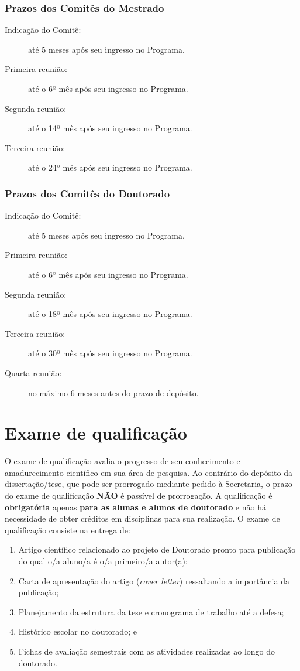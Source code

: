 \subsubsection{Prazos dos Comitês do Mestrado}
\begin{description}
\item[Indicação do Comitê:] até  5 meses após seu ingresso no Programa.
\item[Primeira reunião:] até o 6º mês após seu ingresso no Programa.
\item[Segunda reunião:] até  o 14º mês após seu ingresso no Programa.
\item[Terceira reunião:] até  o 24º mês após seu ingresso no Programa.
\end{description}

\subsubsection{Prazos dos Comitês do Doutorado}
\begin{description}
\item[Indicação do Comitê:] até 5 meses após seu ingresso no Programa.
\item[Primeira reunião:] até o 6º mês após seu ingresso no Programa.
\item[Segunda reunião:] até  o 18º mês após seu ingresso no Programa.
\item[Terceira reunião:] até  o 30º mês após seu ingresso no Programa.
\item[Quarta reunião:] no máximo 6 meses antes do prazo de depósito.
\end{description}


\section{Exame de qualificação}
\label{sec:qualif}

O exame de qualificação avalia o progresso de seu conhecimento e
amadurecimento científico em sua área de pesquisa. Ao contrário do depósito da dissertação/tese, que pode ser prorrogado mediante pedido à Secretaria, o prazo do exame de qualificação \textbf{NÃO} é passível de prorrogação. A qualificação é
\textbf{obrigatória} apenas \textbf{para as alunas e alunos de doutorado} e
não há necessidade de obter créditos em disciplinas para sua
realização. O exame de qualificação consiste na entrega de:
\begin{enumerate}
\item Artigo científico relacionado ao projeto de Doutorado pronto para publicação do qual o/a aluno/a é o/a primeiro/a autor(a);
\item Carta de apresentação do artigo (\emph{cover letter}) ressaltando a importância da publicação; 
\item Planejamento da estrutura da tese e cronograma de trabalho até a defesa;
\item Histórico escolar no doutorado; e 
\item Fichas de avaliação semestrais com as atividades realizadas ao longo do doutorado.
\end{enumerate}

